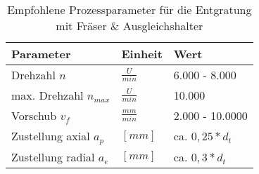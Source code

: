 \begin{table}[ht"]
\centering
\caption{Empfohlene Prozessparameter für die Entgratung mit Fräser \& Ausgleichshalter}
\label{tab:empfohlene_parameter_frser}
\begin{tabular}{@{}lll@{}}
\toprule
\textbf{Parameter}      & \textbf{Einheit}  & \textbf{Wert}   \\ \midrule
Drehzahl $n$            & $\tfrac{U}{min}$  & 6.000 - 8.000   \\
max. Drehzahl $n_{max}$ & $\tfrac{U}{min}$  & 10.000          \\
Vorschub $v_f$          & $\tfrac{mm}{min}$ & 2.000 - 10.0000 \\
Zustellung axial $a_p$  & $[ mm ]$          & ca. $0,25*d_t$  \\
Zustellung radial $a_e$ & $[ mm ]$          & ca. $0,3*d_t$   \\ \bottomrule
\end{tabular}
\end{table}
